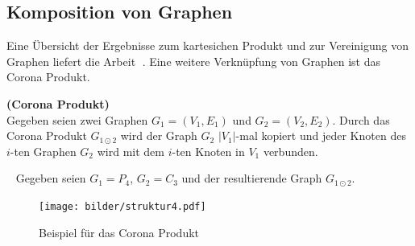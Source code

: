 \subsection{Komposition von Graphen}
Eine Übersicht der Ergebnisse zum kartesichen Produkt und zur Vereinigung von Graphen liefert die Arbeit \grqq$\;$\cite{families}. Eine weitere Verknüpfung von Graphen ist das Corona Produkt.

\begin{defi}{\textbf{(Corona Produkt)}}\\
Gegeben seien zwei Graphen $G_1=(V_1,E_1)$ und $G_2=(V_2,E_2)$. Durch das Corona Produkt $G_{1 \odot 2}$ wird der Graph $G_2$ $|V_1|$-mal kopiert und jeder Knoten des $i$-ten Graphen $G_2$ wird mit dem $i$-ten Knoten in $V_1$ verbunden.
\end{defi}
\begin{bsp} ~ \newline
Gegeben seien $G_1=P_4$, $G_2=C_3$ und der resultierende Graph $G_{1 \odot 2}$.\newline
\vspace{-1mm}
\begin{figure}[ht]
		\centering 		 
   \texttt{[image: bilder/struktur4.pdf]}
	\caption{Beispiel für das Corona Produkt}
  	 \label{bild:vereinigung}
  	 \end{figure}
  	 \vspace{-7mm}
  	 ~\linebreak
\end{bsp}
